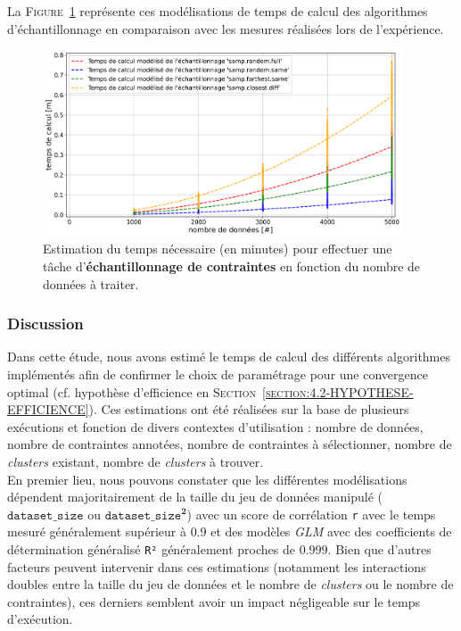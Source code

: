 			La \textsc{Figure~\ref{figure:4.3.2-ETUDE-COUTS-TEMPS-CALCUL-MODELISATION-SAMPLING}} représente ces modélisations de temps de calcul des algorithmes d'échantillonnage en comparaison avec les mesures réalisées lors de l'expérience.
			\newline
			\begin{figure}[!htb]
				\centering
				\includegraphics[width=0.95\textwidth]{figures/etude-temps-calcul-modelisation-4samp}
				\caption{
					Estimation du temps nécessaire (en minutes) pour effectuer une tâche d'\textbf{échantillonnage de contraintes} en fonction du nombre de données à traiter.
				}
				\label{figure:4.3.2-ETUDE-COUTS-TEMPS-CALCUL-MODELISATION-SAMPLING}
			\end{figure}

		\subsubsection{Discussion}
		
			Dans cette étude, nous avons estimé le temps de calcul des différents algorithmes implémentés afin de confirmer le choix de paramétrage pour une convergence optimal (cf. hypothèse d'efficience en \textsc{Section~\ref{section:4.2-HYPOTHESE-EFFICIENCE}}).
			Ces estimations ont été réalisées sur la base de plusieurs exécutions et fonction de divers contextes d'utilisation : nombre de données, nombre de contraintes annotées, nombre de contraintes à sélectionner, nombre de \textit{clusters} existant, nombre de \textit{clusters} à trouver.
			\\
			
			En premier lieu, nous pouvons constater que les différentes modélisations dépendent majoritairement de la taille du jeu de données manipulé ($\texttt{dataset\_size}$ ou $\texttt{dataset\_size}^{\textbf{2}}$) avec un score de corrélation \texttt{r} avec le temps mesuré généralement supérieur à $0.9$ et des modèles \textit{GLM} avec des coefficients de détermination généralisé \texttt{R²} généralement proches de $0.999$.
			Bien que d'autres facteurs peuvent intervenir dans ces estimations (notamment les interactions doubles entre la taille du jeu de données et le nombre de \textit{clusters} ou le nombre de contraintes), ces derniers semblent avoir un impact négligeable sur le temps d'exécution.
			
